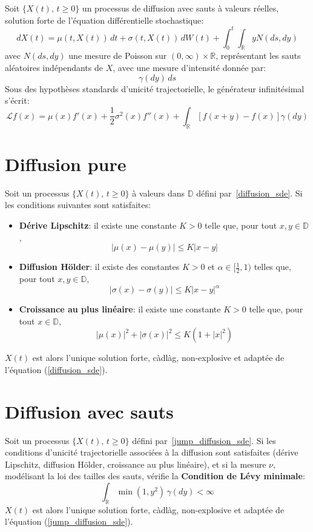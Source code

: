 Soit \( \{X(t),\, t \geq 0\} \) un processus de diffusion avec sauts à valeurs réelles, solution forte de l'équation différentielle stochastique:
\begin{equation}\label{jump_diffusion_sde}
    dX(t) = \mu(t, X(t))\,dt + \sigma(t, X(t))\,dW(t) + \int_0^t\int_{\mathds{R}} yN(ds,dy)
\end{equation}
avec \( N(ds,dy) \) une mesure de Poisson sur \( (0, \infty) \times \mathds{R} \), représentant les sauts aléatoires indépendants de \( X \), avec une mesure d'intensité donnée par:
\[
\gamma(dy)\,ds
\]
Sous des hypothèses standards d'unicité trajectorielle, le générateur infinitésimal s'écrit:
\[
    \mathcal{L}f(x) = \mu(x) f'(x) + \frac{1}{2} \sigma^2(x) f''(x) + \int_{\mathds{R}} \left[f(x+y) - f(x)\right] \gamma(dy)
\]

\label{trajecotry_uniqueness}

\section*{Diffusion pure}

Soit un processus \( \{X(t),\, t \geq 0\} \) à valeurs dans \(\mathds{D}\) défini par~\ref{diffusion_sde}.
Si les conditions suivantes sont satisfaites:
\begin{itemize}
    \item \textbf{Dérive Lipschitz}: il existe une constante \( K > 0 \) telle que, pour tout \( x,y \in \mathds{D} \),
    \[
    |\mu(x)-\mu(y)|\leq K|x-y|
    \]
    \item \textbf{Diffusion Hölder}: il existe des constantes \( K > 0 \) et \(\alpha\in[\frac{1}{2},1)\) telles que, pour tout \( x,y \in \mathds{D} \),
    \[
    |\sigma(x)-\sigma(y)|\leq K{|x-y|}^\alpha
    \]
    \item \textbf{Croissance au plus linéaire}: il existe une constante \( K > 0 \) telle que, pour tout \( x \in \mathds{D} \),
    \[
    |\mu(x)|^2 + |\sigma(x)|^2 \leq K(1 + |x|^2)
    \]
\end{itemize}
$X(t)$ est alors l'unique solution forte, càdlàg, non-explosive  et adaptée de l'équation (\ref{diffusion_sde}).

\section*{Diffusion avec sauts}
Soit un processus \( \{X(t),\, t \geq 0\} \) défini par~\ref{jump_diffusion_sde}.
Si les conditions d'unicité trajectorielle associées à la diffusion sont satisfaites (dérive Lipschitz, diffusion Hölder, croissance au plus linéaire), et si la mesure \( \nu \), modélisant la loi des tailles des sauts, vérifie la \textbf{Condition de Lévy minimale}:
\[
\int_{\mathds{R}}\min(1, y^2)\, \gamma(dy) < \infty
\]
$X(t)$ est alors l'unique solution forte, càdlàg, non-explosive et adaptée de l'équation (\ref{jump_diffusion_sde}).

